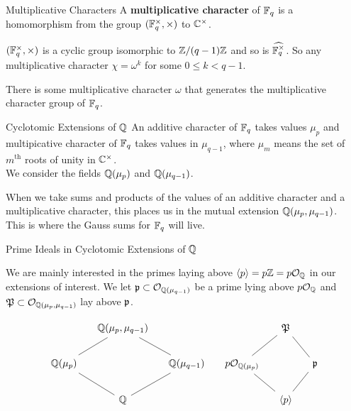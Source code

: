 \documentclass[presentation]{beamer}
\begin{document}
\begin{frame}{Multiplicative Characters}
A \textbf{multiplicative character} of $\mathbb{F}_q$ is a homomorphism from the group $(\mathbb{F}_q^\times, \times)$ to $\mathbb{C}^\times$. 
\\

\pause
\vspace{0.5cm}

$(\mathbb{F}_q^\times, \times)$ is a cyclic group isomorphic to $\mathbb{Z}/(q - 1)\mathbb{Z}$ and so is $\widehat{\mathbb{F}_q^\times}$. So any multiplicative character $\chi = \omega^k$ for some $0 \leq k < q-1$.
\\

\pause
\vspace{0.5cm}

There is some multiplicative character $\omega$ that generates the multiplicative character group of $\mathbb{F}_q$.

\end{frame}

\begin{frame}{Cyclotomic Extensions of $\mathbb{Q}$}
An additive character of $\mathbb{F}_q$ takes values $\mu_p$ and multipicative character of $\mathbb{F}_q$ takes values in $\mu_{q-1}$, where $\mu_m$ means the set of $m^\text{th}$ roots of unity in $\mathbb{C}^\times$.\\

We consider the fields $\mathbb{Q}(\mu_p)$ and $\mathbb{Q}(\mu_{q-1})$.
\\
\pause 
\vspace{0.5cm}

When we take sums and products of the values of an additive character and a multiplicative character, this places us in the mutual extension $\mathbb{Q}(\mu_p, \mu_{q-1})$. 
\\
\pause
\vspace{0.5cm}
This is where the Gauss sums for $\mathbb{F}_q$ will live.


\end{frame}

\begin{frame}{Prime Ideals in Cyclotomic Extensions of $\mathbb{Q}$}

We are mainly interested in the primes laying above $\langle p \rangle = p\mathbb{Z} = p \mathcal{O}_{\mathbb{Q}}$ in our extensions of interest. We let $\mathfrak{p} \subset \mathcal{O}_{\mathbb{Q}(\mu_{q-1})}$ be a prime lying above $p\mathcal{O}_{\mathbb{Q}}$ and $\mathfrak{P} \subset \mathcal{O}_{\mathbb{Q}(\mu_p, \mu_{q-1})}$ lay above $\mathfrak{p}$.
\pause

\[\begin{tikzcd}[ampersand replacement=\&, column sep=small]
	\& {\mathbb{Q}(\mu_p,\mu_{q-1})} \&\&\& {\mathfrak{P}} \\
	{\mathbb{Q}(\mu_p)} \&\& {\mathbb{Q}(\mu_{q-1})} \& {p\mathcal{O}_{\mathbb{Q}(\mu_p)}} \&\& {\mathfrak{p}} \\
	\& {\mathbb{Q}} \&\&\& {\langle p \rangle}
	\arrow[no head, from=3-2, to=2-3]
	\arrow[no head, from=3-2, to=2-1]
	\arrow[no head, from=2-3, to=1-2]
	\arrow[no head, from=2-1, to=1-2]
	\arrow[no head, from=3-5, to=2-6]
	\arrow[no head, from=2-6, to=1-5]
	\arrow[no head, from=3-5, to=2-4]
	\arrow[no head, from=2-4, to=1-5]
\end{tikzcd}\]

\end{frame}
\end{document}
